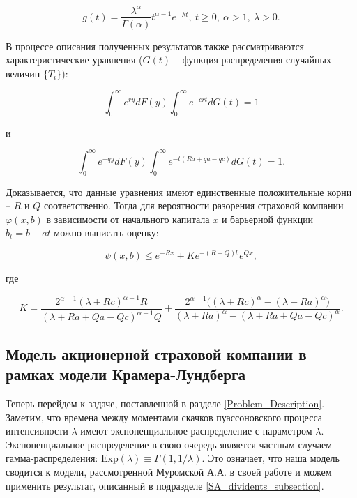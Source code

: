 \documentclass{article}
\theoremstyle{plain}
\theoremstyle{plain}
\theoremstyle{plain}
\theoremstyle{plain}
\theoremstyle{definition}
\theoremstyle{remark}
\begin{document}
\begin{equation}
    g(t) = \frac{\lambda^{\alpha}}{\Gamma(\alpha)} t^{\alpha - 1} e^{-\lambda t},\ t \geq 0,\ \alpha > 1,\ \lambda > 0.
\end{equation}

В процессе описания полученных результатов также рассматриваются характеристические уравнения ($G(t)$ -- функция распределения случайных величин $\{ T_i \}$):

\begin{equation}
\label{char_1}
    \displaystyle \int_0^{\infty} e^{ry} dF(y) \displaystyle \int_0^{\infty} e^{-crt} dG(t) = 1
\end{equation}

и

\begin{equation}
\label{char_2}
    \displaystyle \int_0^{\infty} e^{-qy} dF(y) \displaystyle \int_0^{\infty} e^{-t(Ra + qa - qc)} dG(t) = 1.
\end{equation}

Доказывается, что данные уравнения имеют единственные положительные корни -- $R$ и $Q$ соответственно. Тогда для вероятности разорения страховой компании $\varphi(x, b)$ в зависимости от начального капитала $x$ и барьерной функции $b_t = b + at$ можно выписать оценку:

\begin{equation}
\label{SA_div_proba}
    \psi(x, b) \leq e^{-Rx} + K e^{-(R + Q)b} e^{Qx},
\end{equation}

где

\begin{equation}
\label{K_equation}
    K = \frac{2^{\alpha - 1} (\lambda + Rc)^{\alpha - 1} R}{(\lambda + Ra + Qa - Qc)^{\alpha - 1} Q} + \frac{2^{\alpha - 1} \Big( (\lambda + Rc)^{\alpha} - (\lambda + Ra)^\alpha \Big)}{(\lambda + Ra)^\alpha - (\lambda + Ra + Qa - Qc)^\alpha}.
\end{equation}

\subsection{Модель акционерной страховой компании в рамках модели Крамера-Лундберга}

Теперь перейдем к задаче, поставленной в разделе \ref{Problem_Description}. Заметим, что времена между моментами скачков пуассоновского процесса интенсивности $\lambda$ имеют экспоненциальное распределение с параметром $\lambda$. Экспоненциальное распределение в свою очередь является частным случаем гамма-распределения: $\mathrm{Exp}(\lambda) \equiv \Gamma(1, 1 / \lambda)$. Это означает, что наша модель сводится к модели, рассмотренной Муромской А.А. в своей работе \cite{SA_dividends} и можем применить результат, описанный в подразделе \ref{SA_dividents_subsection}.
\end{document}

